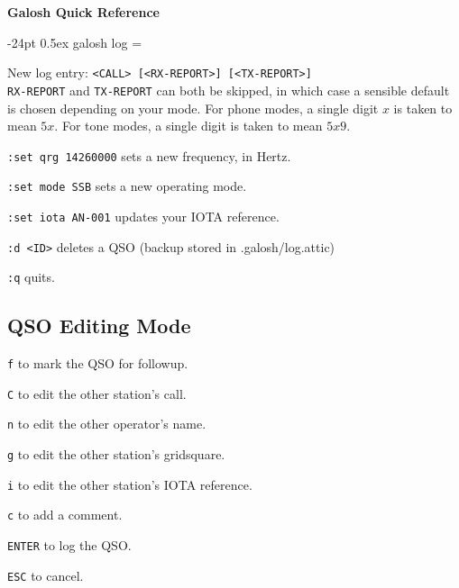 \documentclass[10pt,landscape,a4paper]{article}
\makeatletter
\renewcommand\section{\@startsection{section}{1}{0mm}%
                                     {-24pt}%
                                     {0.5ex}%
                                {\large\bfseries}}
\newcommand{\code}{\texttt}
\makeatother
\begin{document}
\footnotesize
\begin{multicols*}{3}

\setlength{\premulticols}{1pt}
\setlength{\postmulticols}{1pt}
\setlength{\multicolsep}{1pt}
\setlength{\columnsep}{2pt}

\begin{center}
     \Large{\textbf{Galosh Quick Reference}} \\
\end{center}

\section{galosh log}
\everypar={\hangindent=9mm}

New log entry: \code{<CALL> [<RX-REPORT>] [<TX-REPORT>]} \\
\code{RX-REPORT} and \code{TX-REPORT} can both be skipped, in which case
a sensible default is chosen depending on your mode.  For phone modes, a
single digit $x$ is taken to mean $5x$.  For tone modes, a single digit is
taken to mean $5x9$.

\code{:set qrg 14260000} sets a new frequency, in Hertz.

\code{:set mode SSB} sets a new operating mode.

\code{:set iota AN-001} updates your IOTA reference.

\code{:d <ID>} deletes a QSO (backup stored in .galosh/log.attic)

\code{:q} quits.

\subsection{QSO Editing Mode}

\code{f} to mark the QSO for followup.

\code{C} to edit the other station's call.

\code{n} to edit the other operator's name.

\code{g} to edit the other station's gridsquare.

\code{i} to edit the other station's IOTA reference.

\code{c} to add a comment.

\code{ENTER} to log the QSO.

\code{ESC} to cancel.

\end{multicols*}
\end{document}
